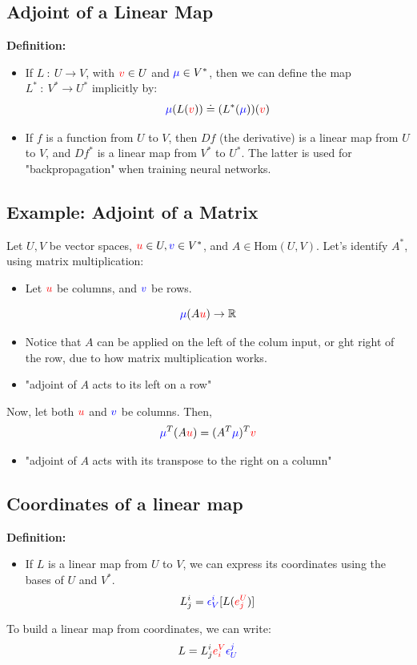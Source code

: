 \documentclass[10pt]{article}
\newcommand{\R}{\mathbb{R}}
\begin{document}
\subsection*{Adjoint of a Linear Map}
\textbf{Definition:}
\begin{itemize}
    \item If $L\::\: U \rightarrow V$, with $\textcolor{red}{v} \in U$ and $\textcolor{blue}{\mu} \in V^*$, then we can define the map $L^* \::\: V^* \rightarrow U^*$ implicitly by:
    \[\textcolor{blue}{\mu}(L(\textcolor{red}{v})) \doteq (L^*(\textcolor{blue}{\mu}))(\textcolor{red}{v})\]
    \item If $f$ is a function from $U$ to $V$, then $Df$ (the derivative) is a linear map from $U$ to $V$, and $Df^*$ is a linear map from $V^*$ to $U^*$.  The latter is used for "backpropagation" when training neural networks.
\end{itemize}

\subsection*{Example: Adjoint of a Matrix}
Let $U, V$ be vector spaces, $\textcolor{red}{u} \in U, \textcolor{blue}{v} \in V^*$, and $A \in \text{Hom}(U, V)$.  Let's identify $A^*$, using matrix multiplication:
\begin{itemize}
    \item Let $\textcolor{red}{u}$ be columns, and $\textcolor{blue}{v}$ be rows.
\end{itemize}
\[\textcolor{blue}{\mu}(A\textcolor{red}{u}) \rightarrow \R\]
\begin{itemize}
    \item Notice that $A$ can be applied on the left of the colum input, or ght right of the row, due to how matrix multiplication works.
    \item "adjoint of $A$ acts to its left on a row"
\end{itemize}
Now, let both $\textcolor{red}{u}$ and $\textcolor{blue}{v}$ be columns.  Then,
\[\textcolor{blue}{\mu}^T(A\textcolor{red}{u}) = (A^T \textcolor{blue}{\mu})^T \textcolor{red}{v}\]
\begin{itemize}
    \item "adjoint of $A$ acts with its transpose to the right on a column"
\end{itemize}

\subsection*{Coordinates of a linear map}
\textbf{Definition:}
\begin{itemize}
    \item If $L$ is a linear map from $U$ to $V$, we can express its coordinates using the bases of $U$ and $V^*$.
    \[L_j^i = \textcolor{blue}{\epsilon_V^i}[L(\textcolor{red}{e_j^U})]\]
\end{itemize}
To build a linear map from coordinates, we can write:
\[L = L_j^i \textcolor{red}{e_i^V} \textcolor{blue}{\epsilon_U^j}\]
\end{document}
